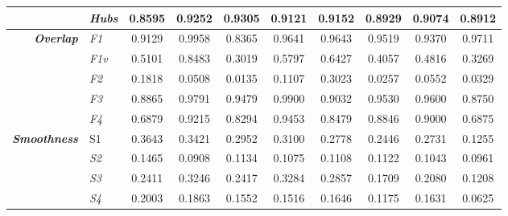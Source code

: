 \begin{center}
\begin{longtable}{ | r  l | c | c | c | c | c | c | c | c | }
& \emph{Hubs} & 
0.8595 & 0.9252 & 0.9305 & 0.9121 & 0.9152 & 0.8929 & 0.9074 & 0.8912 \\ 
\hline
\multirow{5}{*}{\emph{\textbf{Overlap}}} & \emph{F1} & 
0.9129 & 0.9958 & 0.8365 & 0.9641 & 0.9643 & 0.9519 & 0.9370 & 0.9711 \\ 
& \emph{F1v} & 
0.5101 & 0.8483 & 0.3019 & 0.5797 & 0.6427 & 0.4057 & 0.4816 & 0.3269 \\ 
& \emph{F2} & 
0.1818 & 0.0508 & 0.0135 & 0.1107 & 0.3023 & 0.0257 & 0.0552 & 0.0329 \\ 
& \emph{F3} & 
0.8865 & 0.9791 & 0.9479 & 0.9900 & 0.9032 & 0.9530 & 0.9600 & 0.8750 \\ 
& \emph{F4} & 
0.6879 & 0.9215 & 0.8294 & 0.9453 & 0.8479 & 0.8846 & 0.9000 & 0.6875 \\ 
\hline
\multirow{4}{*}{\emph{\textbf{Smoothness}}} & S1 & 
0.3643 & 0.3421 & 0.2952 & 0.3100 & 0.2778 & 0.2446 & 0.2731 & 0.1255 \\ 
& \emph{S2} & 
0.1465 & 0.0908 & 0.1134 & 0.1075 & 0.1108 & 0.1122 & 0.1043 & 0.0961 \\ 
& \emph{S3} & 
0.2411 & 0.3246 & 0.2417 & 0.3284 & 0.2857 & 0.1709 & 0.2080 & 0.1208 \\ 
& \emph{S4} & 
0.2003 & 0.1863 & 0.1552 & 0.1516 & 0.1646 & 0.1175 & 0.1631 & 0.0625 \\ 
\end{longtable}
\end{center}
